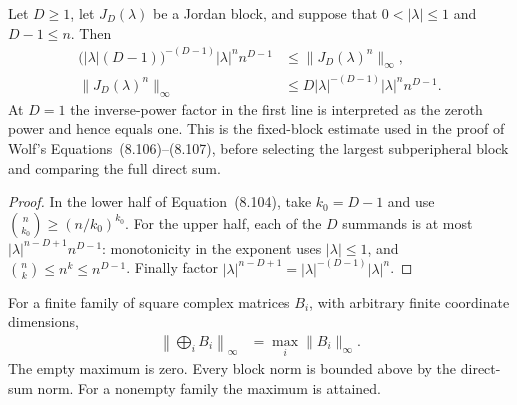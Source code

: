 \begin{theorem}
    \label{thm:wolf_single_jordan_block_polynomial_scaling}
    \leanok
    Let $D\ge 1$, let $J_D(\lambda)$ be a Jordan block, and suppose that
    $0<|\lambda|\le1$ and $D-1\le n$.  Then
    \begin{align}
      \bigl(|\lambda|(D-1)\bigr)^{-(D-1)}
        |\lambda|^n n^{D-1}
      &\le \lVert J_D(\lambda)^n\rVert_\infty,\\
      \lVert J_D(\lambda)^n\rVert_\infty
      &\le D|\lambda|^{-(D-1)}
        |\lambda|^n n^{D-1}.
    \end{align}
    At $D=1$ the inverse-power factor in the first line is interpreted as
    the zeroth power and hence equals one.  This is the fixed-block estimate
    used in the proof of Wolf's Equations~(8.106)--(8.107), before selecting
    the largest subperipheral block and comparing the full direct sum.
\end{theorem}

\begin{proof}
    \leanok
    In the lower half of Equation~(8.104), take $k_0=D-1$ and use
    $\binom{n}{k_0}\ge(n/k_0)^{k_0}$.  For the upper half, each of the $D$
    summands is at most
    $|\lambda|^{n-D+1}n^{D-1}$: monotonicity in the exponent uses
    $|\lambda|\le1$, and $\binom nk\le n^k\le n^{D-1}$.  Finally factor
    $|\lambda|^{n-D+1}=|\lambda|^{-(D-1)}|\lambda|^n$.

\end{proof}

\begin{theorem}
    \label{thm:wolf_finite_block_diagonal_norm_maximum}
    \leanok
    For a finite family of square complex matrices $B_i$, with arbitrary
    finite coordinate dimensions,
    \begin{align}
      \left\lVert\bigoplus_i B_i\right\rVert_\infty
        &=\max_i\lVert B_i\rVert_\infty.
    \end{align}
    The empty maximum is zero. Every block norm is bounded above by the
    direct-sum norm. For a nonempty family the maximum is attained.
\end{theorem}

